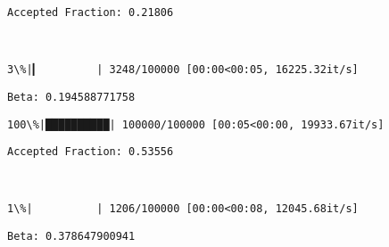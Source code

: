 \documentclass[11pt]{article}
\begin{document}
    \begin{Verbatim}[commandchars=\\\{\}]
Accepted Fraction: 0.21806

    \end{Verbatim}

    \begin{center}
    \end{center}
    { \hspace*{\fill} \\}
    
    \begin{Verbatim}[commandchars=\\\{\}]
  3\%|▎         | 3248/100000 [00:00<00:05, 16225.32it/s]
    \end{Verbatim}

    \begin{Verbatim}[commandchars=\\\{\}]
Beta: 0.194588771758

    \end{Verbatim}

    \begin{Verbatim}[commandchars=\\\{\}]
100\%|██████████| 100000/100000 [00:05<00:00, 19933.67it/s]

    \end{Verbatim}

    \begin{Verbatim}[commandchars=\\\{\}]
Accepted Fraction: 0.53556

    \end{Verbatim}

    \begin{center}
    \end{center}
    { \hspace*{\fill} \\}
    
    \begin{Verbatim}[commandchars=\\\{\}]
  1\%|          | 1206/100000 [00:00<00:08, 12045.68it/s]
    \end{Verbatim}

    \begin{Verbatim}[commandchars=\\\{\}]
Beta: 0.378647900941

    \end{Verbatim}
\end{document}
